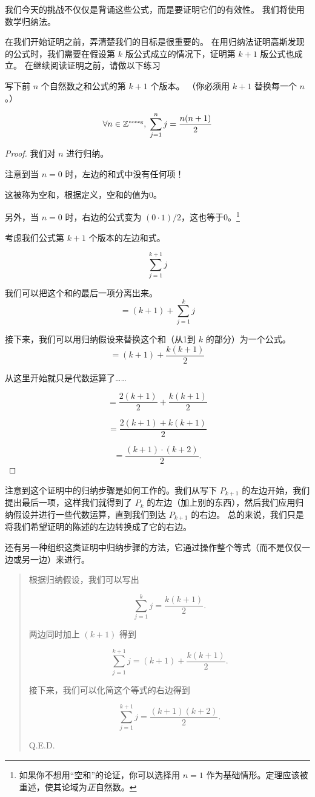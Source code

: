我们今天的挑战不仅仅是背诵这些公式，而是要证明它们的有效性。
我们将使用数学归纳法。

在我们开始证明之前，弄清楚我们的目标是很重要的。
在用归纳法证明高斯发现的公式时，我们需要在假设第 $k$ 版公式成立的情况下，证明第 $k+1$ 版公式也成立。
在继续阅读证明之前，请做以下练习

\begin{exer}
写下前 $n$ 个自然数之和公式的第 $k+1$ 个版本。
（你必须用 $k+1$ 替换每一个 $n$。）
\end{exer}

\begin{thm}
\[ \forall n \in {\mathbb Z}^{\mbox{\tiny noneg}}, \; \sum_{j=1}^n j = \frac{n(n+1)}{2} \]
\end{thm}

\begin{proof}
我们对 $n$ 进行归纳。

注意到当 $n=0$ 时，左边的和式中没有任何项！

这被称为空和，根据定义，空和的值为0。

另外，当 $n=0$ 时，右边的公式变为 $(0 \cdot 1)/2$，这也等于0。\footnote{如果你不想用“空和”的论证，你可以选择用 $n=1$ 作为基础情形。定理应该被重述，使其论域为\emph{正}自然数。}

考虑我们公式第 $k+1$ 个版本的左边和式。

\[ \sum_{j=1}^{k+1} j \]

我们可以把这个和的最后一项分离出来。
\[ = (k+1) + \sum_{j=1}^{k} j \]

接下来，我们可以用归纳假设来替换这个和（从1到 $k$ 的部分）为一个公式。
\[ = (k+1) + \frac{k(k+1)}{2} \]

从这里开始就只是代数运算了……

\[ = \frac{2(k+1)}{2} + \frac{k(k+1)}{2} \]

\[ = \frac{2(k+1) + k(k+1)}{2} \]

\[ = \frac{(k+1) \cdot (k+2)}{2}.
\]

\end{proof}
\medskip

注意到这个证明中的归纳步骤是如何工作的。我们从写下 $P_{k+1}$ 的左边开始，我们提出最后一项，这样我们就得到了 $P_k$ 的左边（加上别的东西），然后我们应用归纳假设并进行一些代数运算，直到我们到达 $P_{k+1}$ 的右边。
总的来说，我们只是将我们希望证明的陈述的左边转换成了它的右边。

还有另一种组织这类证明中归纳步骤的方法，它通过操作整个等式（而不是仅仅一边或另一边）来进行。
\begin{quote}

根据归纳假设，我们可以写出

\[ \sum_{j=1}^{k} j = \frac{k(k+1)}{2}.
\]

两边同时加上 $(k+1)$ 得到

\[ \sum_{j=1}^{k+1} j = (k+1) + \frac{k(k+1)}{2}.
\]

接下来，我们可以化简这个等式的右边得到

\[ \sum_{j=1}^{k+1} j = \frac{(k+1)(k+2)}{2}. \]

\rule{0pt}{0pt} \hspace{\fill} Q.E.D.
\end{quote}
\medskip

